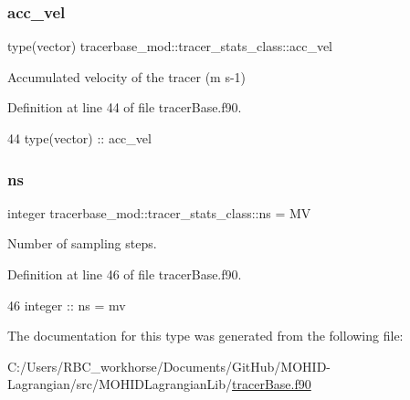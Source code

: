 \subsubsection{\texorpdfstring{acc\+\_\+vel}{acc\_vel}}
{\footnotesize\ttfamily type(vector) tracerbase\+\_\+mod\+::tracer\+\_\+stats\+\_\+class\+::acc\+\_\+vel\hspace{0.3cm}{\ttfamily [private]}}



Accumulated velocity of the tracer (m s-\/1) 



Definition at line 44 of file tracer\+Base.\+f90.


\begin{DoxyCode}
44         \textcolor{keywordtype}{type}(vector) :: acc\_vel
\end{DoxyCode}
\mbox{\label{structtracerbase__mod_1_1tracer__stats__class_ad0fd94fb56ff9eaf4766fabc2e83b3a7}} 
\subsubsection{\texorpdfstring{ns}{ns}}
{\footnotesize\ttfamily integer tracerbase\+\_\+mod\+::tracer\+\_\+stats\+\_\+class\+::ns = MV\hspace{0.3cm}{\ttfamily [private]}}



Number of sampling steps. 



Definition at line 46 of file tracer\+Base.\+f90.


\begin{DoxyCode}
46         \textcolor{keywordtype}{integer} :: ns = mv                      
\end{DoxyCode}


The documentation for this type was generated from the following file\+:\begin{DoxyCompactItemize}
\item 
C\+:/\+Users/\+R\+B\+C\+\_\+workhorse/\+Documents/\+Git\+Hub/\+M\+O\+H\+I\+D-\/\+Lagrangian/src/\+M\+O\+H\+I\+D\+Lagrangian\+Lib/\mbox{\hyperlink{tracer_base_8f90}{tracer\+Base.\+f90}}\end{DoxyCompactItemize}

